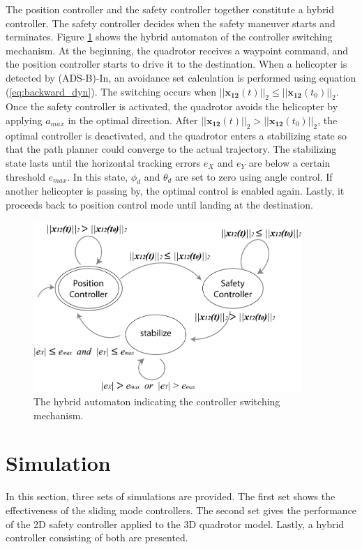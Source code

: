 \documentclass[journal,11pt,onecolumn,draftclsnofoot,]{IEEEtran}
\begin{document}
The position controller and the safety controller together constitute a hybrid controller. The safety controller decides when the safety maneuver starts and terminates. Figure \ref{fig:hybrid_automaton} shows the hybrid automaton of the controller switching mechanism. At the beginning, the quadrotor receives a waypoint command, and the position controller starts to drive it to the destination. When a helicopter is detected by (ADS-B)-In, an avoidance set calculation is performed using equation (\ref{eq:backward_dyn}). The switching occurs when $||\boldsymbol{x_{12}}(t)||_2 \le ||\boldsymbol{x_{12}}(t_0)||_2$. Once the safety controller is activated, the quadrotor avoids the helicopter by applying $a_{max}$ in the optimal direction. After $||\boldsymbol{x_{12}}(t)||_2 > ||\boldsymbol{x_{12}}(t_0)||_2$, the optimal controller is deactivated, and the quadrotor enters a stabilizing state so that the path planner could converge to the actual trajectory. The stabilizing state lasts until the horizontal tracking errors $e_X$ and $e_Y$ are below a certain threshold $e_{max}$. In this state, $\phi_d$ and $\theta_d$ are set to zero using angle control. If another helicopter is passing by, the optimal control is enabled again. Lastly, it proceeds back to position control mode until landing at the destination.

\begin{figure}
\centering
\includegraphics[width=4in]{hybrid_automaton}
\caption{The hybrid automaton indicating the controller switching mechanism.}
\label{fig:hybrid_automaton}
\end{figure}

\section{\textbf{Simulation}} \label{sec:simulation}

In this section, three sets of simulations are provided. The first set shows the effectiveness of the sliding mode controllers. The second set gives the performance of the 2D safety controller applied to the 3D quadrotor model. Lastly, a hybrid controller consisting of both are presented.
\end{document}
